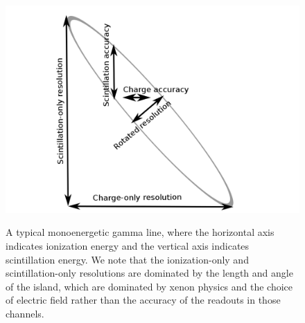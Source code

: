 \begin{figure}
\begin{center}
\includegraphics[keepaspectratio=true,width=.7\textwidth]{RotatedIsland.png}
\end{center}
\renewcommand{\baselinestretch}{1}
\small\normalsize
\begin{quote}
\caption{A typical monoenergetic gamma line, where the horizontal axis indicates ionization energy and the vertical axis indicates scintillation energy.  We note that the ionization-only and scintillation-only resolutions are dominated by the length and angle of the island, which are dominated by xenon physics and the choice of electric field rather than the accuracy of the readouts in those channels.}
\label{fig:RotatedIslandSchematic}
\end{quote}
\end{figure}
\renewcommand{\baselinestretch}{2}
\small\normalsize

